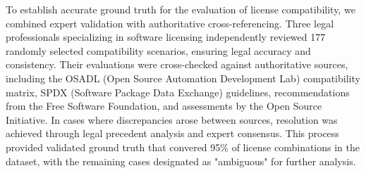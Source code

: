 To establish accurate ground truth for the evaluation of license compatibility, we combined expert validation with authoritative cross-referencing. Three legal professionals specializing in software licensing independently reviewed 177 randomly selected compatibility scenarios, ensuring legal accuracy and consistency. Their evaluations were cross-checked against authoritative sources, including the OSADL (Open Source Automation Development Lab) compatibility matrix, SPDX (Software Package Data Exchange) guidelines, recommendations from the Free Software Foundation, and assessments by the Open Source Initiative. In cases where discrepancies arose between sources, resolution was achieved through legal precedent analysis and expert consensus. This process provided validated ground truth that convered 95\% of license combinations in the dataset, with the remaining cases designated as "ambiguous" for further analysis.


\begin{comment}
\subsection{Baselines}


In our experimental evaluation, we relied on the same prototype baselines previously introduced and detailed in Table~\ref{tab:related_work_comparison}. These baselines were selected to ensure consistency with prior work and to provide a fair comparison framework for assessing the effectiveness of our approach. Each baseline thus serves as a solid benchmark, allowing us to highlight improvements and limitations in a controlled and comparable setting.
\end{comment}

